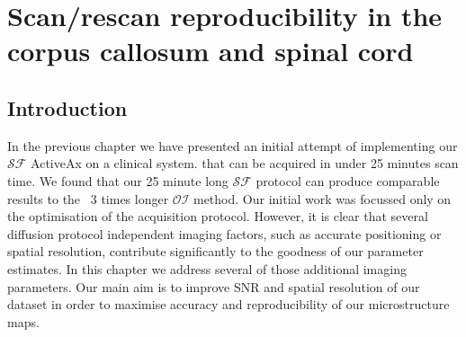 \newcommand{\SF}{{\ensuremath{\mathcal{SF}}}}
\newcommand{\OI}{{\ensuremath{\mathcal{OI}}}}
\newcommand{\SD}{{\ensuremath{\mathcal{SF}_{pulses}}}}
\newcommand{\DO}{{\ensuremath{\mathcal{SF}_{dirs}}}}
\newcommand{\FD}{{\SF}}
\newcommand{\FDmod}{{\ensuremath{\FD_{mod}}}}
\newcommand{\SFasym}{{\ensuremath{a\mathcal{SF}}}}

\newcommand{\SFshort}{\SF$_{90}$}
\newcommand{\SFlong}{\SF$_{360}$}
\newcommand{\OIlong}{\OI$_{360}$}


\newsavebox{\poorBox}
\savebox{\poorBox}{\textcolor{red}{\rule{0.05in}{0.05in}}}
\newsavebox{\fairBox}
\savebox{\fairBox}{\textcolor{orange}{\rule{0.05in}{0.05in}}}
\newsavebox{\moderateBox}
\savebox{\moderateBox}{\textcolor{yellow}{\rule{0.05in}{0.05in}}}
\newsavebox{\substantialBox}
\savebox{\substantialBox}{\textcolor{lime}{\rule{0.05in}{0.05in}}}
\newsavebox{\perfectBox}
\savebox{\perfectBox}{\textcolor{green}{\rule{0.05in}{0.05in}}}


\chapter[Scan/rescan in the corpus callosum]{Scan/rescan reproducibility in the corpus callosum and spinal cord}
\section{Introduction}
In the previous chapter we have presented an initial attempt of implementing our {\SF} ActiveAx  on a clinical system. that can be acquired in under 25 minutes scan time. We found that our 25 minute long \SF{} protocol can produce comparable results to the ~3 times longer \OI{} method. Our initial work was focussed only on the optimisation of the acquisition protocol. However, it is clear that several diffusion protocol independent imaging factors, such as accurate positioning or spatial resolution, contribute significantly to the goodness of our parameter estimates. In this chapter we address several of those additional imaging parameters. Our main aim is to improve SNR and spatial resolution of our dataset in order to maximise accuracy and  reproducibility of our microstructure maps. 


